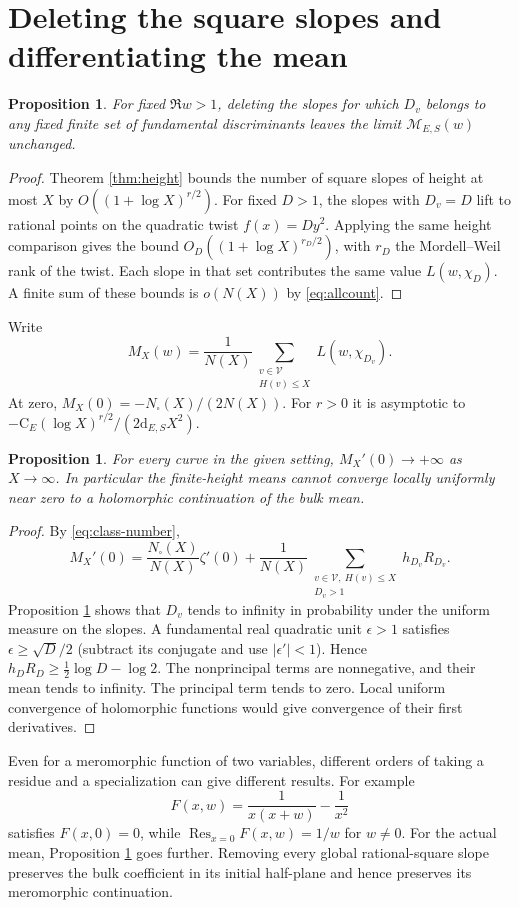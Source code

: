\documentclass[11pt]{article}
\newtheorem{proposition}[theorem]{Proposition}
\newcommand{\calV}{\mathcal{V}}
\newcommand{\Res}{\operatorname*{Res}}
\begin{document}
\section{Deleting the square slopes and differentiating the mean}
\begin{proposition}\label{prop:delete}
For fixed $\Re w>1$, deleting the slopes for which $D_v$ belongs to any
fixed finite set of fundamental discriminants leaves the limit
$\mathcal M_{E,S}(w)$ unchanged.
\end{proposition}
\begin{proof}
Theorem \ref{thm:height} bounds the number of square slopes of height
at most $X$ by $O((1+\log X)^{r/2})$. For fixed $D>1$, the slopes with
$D_v=D$ lift to rational points on the quadratic twist $f(x)=Dy^2$.
Applying the same height comparison gives the bound
$O_D((1+\log X)^{r_D/2})$, with $r_D$ the Mordell--Weil rank of the twist.
Each slope in that set contributes the same value $L(w,\chi_D)$.
A finite sum of these bounds is $o(N(X))$ by \eqref{eq:allcount}.
\end{proof}

Write
\[
 M_X(w)=\frac1{N(X)}\sum_{\substack{v\in\calV\\ H(v)\le X}}L(w,\chi_{D_v}).
\]
At zero, $M_X(0)=-N_\square(X)/(2N(X))$. For $r>0$ it is asymptotic to
$-\mathrm C_E(\log X)^{r/2}/(2\mathrm d_{E,S}X^2)$.
\begin{proposition}
For every curve in the given setting, $M_X'(0)\to+\infty$ as
$X\to\infty$. In particular the finite-height means cannot converge
locally uniformly near zero to a holomorphic continuation of the bulk mean.
\end{proposition}
\begin{proof}
By \eqref{eq:class-number},
\[
 M_X'(0)=\frac{N_\square(X)}{N(X)}\zeta'(0)+
 \frac1{N(X)}\sum_{\substack{v\in\calV,\ H(v)\le X\\D_v>1}}h_{D_v}R_{D_v}.
\]
Proposition \ref{prop:delete} shows that $D_v$ tends to infinity in
probability under the uniform measure on the slopes. A fundamental real
quadratic unit $\epsilon>1$ satisfies $\epsilon\ge\sqrt D/2$ (subtract
its conjugate and use $|\epsilon'|<1$). Hence
$h_DR_D\ge\tfrac12\log D-\log2$. The nonprincipal terms are nonnegative,
and their mean tends to infinity. The principal term tends to zero.
Local uniform convergence of holomorphic functions would give
convergence of their first derivatives.
\end{proof}

Even for a meromorphic function of two variables, different orders of taking
a residue and a specialization can give different results. For example
\[
 F(x,w)=\frac1{x(x+w)}-\frac1{x^2}
\]
satisfies $F(x,0)=0$, while $\Res_{x=0}F(x,w)=1/w$ for $w\ne0$.
For the actual mean, Proposition \ref{prop:delete} goes further.
Removing every global rational-square slope preserves the bulk coefficient
in its initial half-plane and hence preserves its meromorphic continuation.
\end{document}
